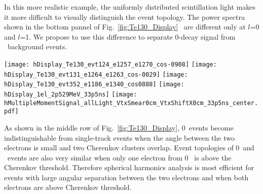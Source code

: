 In this more realistic example, the uniformly distributed scintillation light makes it more difficult to 
visually distinguish the event topology. The power spectra shown in the bottom pannel of Fig.~\ref{fig:Te130_Display}~
are different only at $l$=0 and $l$=1. We propose to use this difference to separate 0\nbb-decay signal from \B~background events.

\begin{figure*}[h]
  \centering
  \texttt{[image: hDisplay\_Te130\_evt124\_e1257\_e1270\_cos-0908]}
  \texttt{[image: hDisplay\_Te130\_evt131\_e1264\_e1263\_cos-0029]}
  \texttt{[image: hDisplay\_Te130\_evt352\_e1186\_e1340\_cos0888]}
  \texttt{[image: hDisplay\_1el\_2p529MeV\_33p5ns]}
  \texttt{[image: hMultipleMomentSignal\_allLight\_VtxSmear0cm\_VtxShiftX0cm\_33p5ns\_center.pdf]} 
  \caption{ \emph{Top and middle rows:} Event display examples for {\Te} 0{\nbb}-decay signal and {\B} background events.
    The default QE and the time cut of 33.5~ns are applied to both Cherenkov (\emph{triangles}) and scintillation (\emph{crosses}) 
    photons. For the {\Te} 0{\nbb}-decay signal three representative events are shown each closely matching on of the three
    topologies. A typical single electron event is shown for the {\B} background.
    \emph{Top left:} $^{130}$Te 0{\nbb}-decay back-to-back electrons: $E_1$=1.257~MeV, $E_2$=1.270~MeV, 
    cos($\theta$)=-0.908. \emph{Top right:} $^{130}$Te 0{\nbb}-decay electrons at $\sim$90$^{\circ}$: $E_1$=1.264~MeV, $E_2$=1.263~MeV,
    cos($\theta$)=-0.029. \emph{Middle left:} $^{130}$Te 0{\nbb}-decay electrons at $\sim$0$^{\circ}$: $E_1$=1.186~MeV, $E_2$=1.340~MeV,
    cos($\theta$)=0.888. \emph{Middle right:} 2.529~MeV single electron. In all events electrons originate at the center of the detector.
    \emph{Bottom panel:} Normalized power spectrum $S_l$ calculated for distribution of all PE after the 33.5~ns time cut. 
    {\Te} 0{\nbb}-decay signal (\emph{solid red line}) and {\B} background (\emph{dashed blue line}) topologies are compared.
    Simulation of 1000 signal and background events. The normalized power values $S_l$'s were calculated for each individual event. 
    The horizontal lines correspond to the mean values of $S_l$. The vertical bars show one standard deviation 
    from the mean value.}
\label{fig:Te130_Display}
\end{figure*}


As shown in the middle row of Fig.~\ref{fig:Te130_Display}, 0\nbb~events become indistinguishable from single-track events when the 
angle between the two electrons is small and two Cherenkov clusters overlap. Event topologies of 0\nbb~and \B~events are also 
very similar when only one electron from 0\nbb~ is above the Cherenkov threshold. Therefore spherical harmonics analysis is most 
efficient for events with large angular separation between the two electrons and when both electrons are above Cherenkov threshold.

